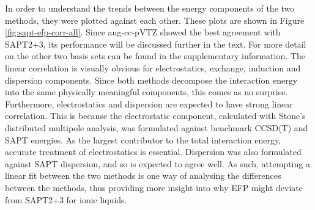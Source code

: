 

In order to understand the trends between the energy components of the two methods, they were plotted against each other. 
These plots are shown in Figure \ref{fig:sapt-efp-corr-all}.
Since aug-cc-pVTZ showed the best agreement with SAPT2+3,  its performance will be discussed further in the text. 
For more detail on the other two basis sets can be found in the supplementary information.
The linear correlation is visually obvious for electrostatics, exchange, induction and dispersion components.
Since both methods decompose the interaction energy into the same physically meaningful components, this comes as no surprise.
Furthermore, electrostatics and dispersion are expected to have strong linear correlation.
This is because the electrostatic component, calculated with Stone's distributed multipole analysis, was formulated against benchmark CCSD(T) and SAPT energies.
\cite{Slipchenko2007a}
As the largest contributor to the total interaction energy, accurate treatment of electrostatics is essential.
Dispersion was also formulated against SAPT dispersion, and so is expected to agree well.
\cite{Adamovic2005a}
As such, attempting a linear fit between the two methods is one way of analysing the differences between the methods, thus providing more insight into why EFP might deviate from SAPT2+3 for ionic liquids.


